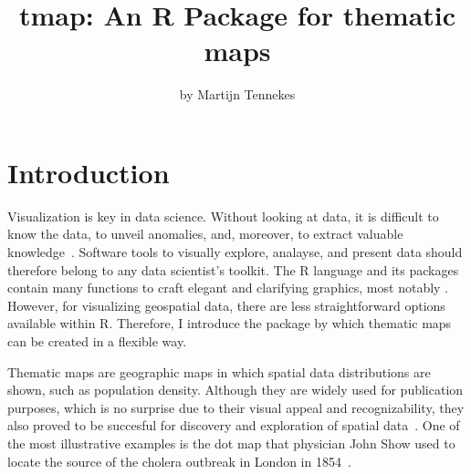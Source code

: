 \title{tmap: An R Package for thematic maps}
\author{by Martijn Tennekes}

\maketitle




\section{Introduction}

Visualization is key in data science. Without looking at data, it is difficult to know the data, to unveil anomalies, and, moreover, to extract valuable knowledge~\citep{tufte83}. Software tools to visually explore, analayse, and present data should therefore belong to any data scientist's toolkit. The R language and its packages contain many functions to craft elegant and clarifying graphics, most notably \citep{ggplot2}. However, for visualizing geospatial data, there are less straightforward options available within R. Therefore, I introduce the  package by which thematic maps can be created in a flexible way.

Thematic maps are geographic maps in which spatial data distributions are shown, such as population density. Although they are widely used for publication purposes, which is no surprise due to their visual appeal and recognizability, they also proved to be succesful for discovery and exploration of spatial data~\citep{friendly95}. One of the most illustrative examples is the dot map that physician John Show used to locate the source of the cholera outbreak in London in 1854~\citep{snow1855}.


